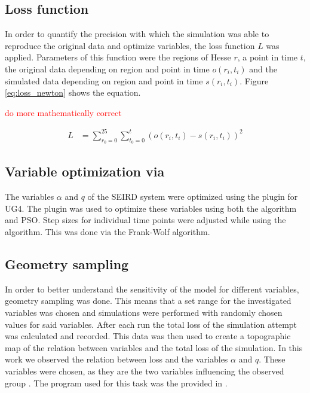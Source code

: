 \subsection{Loss function}
In order to quantify the precision with which the simulation was able to reproduce the original data and optimize variables, the loss function $L$
was applied. Parameters of this function were the regions of Hesse $r$, a point in time $t$, the original data depending on
region and point in time $o(r_i,t_i)$ and the simulated data depending on region and point in time $s(r_i, t_i)$. Figure \ref*{eq:loss_newton}
shows the equation.

\textcolor{red}{do more mathematically correct}

\begin{align}
	L &= \sum_{r_0=0}^{25} \sum_{t_{0}=0}^{t} (o(r_i,t_i) - s(r_i,t_i))^{2}
	\label{eq:loss_newton}
\end{align}


\subsection{Variable optimization via }
The variables $\alpha$ and $q$ of the SEIRD system were optimized using the  plugin for UG4\cite{???}.
The plugin was used to optimize these variables using both the  algorithm and PSO. Step sizes for
individual time points were adjusted while using the  algorithm. This was done via the Frank-Wolf algorithm\cite{Rastogi}\cite{frank-wolf}. %


\subsection{Geometry sampling}
In order to better understand the sensitivity of the model for different variables, geometry sampling was done. This means that a set range for the
investigated variables was chosen and simulations were performed with randomly chosen values for said variables. After each run the total
loss of the simulation attempt was calculated and recorded. This data was then used to create a topographic map of the relation between variables
and the total loss of the simulation. In this work we observed the relation between loss and the variables $\alpha$ and $q$. These variables
were chosen, as they are the two variables influencing the observed group . The program used for this task was the 
provided in .


